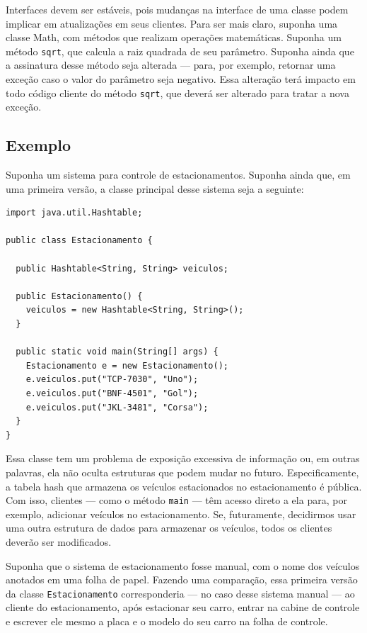 \documentclass[
  11pt,
  twoside]{book}
\newcommand{\passthrough}[1]{#1}
\begin{document}
Interfaces devem ser estáveis, pois mudanças na interface de uma classe
podem implicar em atualizações em seus clientes. Para ser mais claro,
suponha uma classe Math, com métodos que realizam operações matemáticas.
Suponha um método \passthrough{\lstinline!sqrt!}, que calcula a raiz
quadrada de seu parâmetro. Suponha ainda que a assinatura desse método
seja alterada --- para, por exemplo, retornar uma exceção caso o valor
do parâmetro seja negativo. Essa alteração terá impacto em todo código
cliente do método \passthrough{\lstinline!sqrt!}, que deverá ser
alterado para tratar a nova exceção.

\hypertarget{exemplo-1}{%
\subsection{Exemplo}\label{exemplo-1}}

Suponha um sistema para controle de estacionamentos. Suponha ainda que,
em uma primeira versão, a classe principal desse sistema seja a
seguinte:

\begin{lstlisting}
import java.util.Hashtable;

public class Estacionamento {

  public Hashtable<String, String> veiculos;

  public Estacionamento() {
    veiculos = new Hashtable<String, String>();
  }

  public static void main(String[] args) {
    Estacionamento e = new Estacionamento();
    e.veiculos.put("TCP-7030", "Uno");
    e.veiculos.put("BNF-4501", "Gol");
    e.veiculos.put("JKL-3481", "Corsa");
  }
}
\end{lstlisting}

Essa classe tem um problema de exposição excessiva de informação ou, em
outras palavras, ela não oculta estruturas que podem mudar no futuro.
Especificamente, a tabela hash que armazena os veículos estacionados no
estacionamento é pública. Com isso, clientes --- como o método
\passthrough{\lstinline!main!} --- têm acesso direto a ela para, por
exemplo, adicionar veículos no estacionamento. Se, futuramente,
decidirmos usar uma outra estrutura de dados para armazenar os veículos,
todos os clientes deverão ser modificados.

Suponha que o sistema de estacionamento fosse manual, com o nome dos
veículos anotados em uma folha de papel. Fazendo uma comparação, essa
primeira versão da classe \passthrough{\lstinline!Estacionamento!}
corresponderia --- no caso desse sistema manual --- ao cliente do
estacionamento, após estacionar seu carro, entrar na cabine de controle
e escrever ele mesmo a placa e o modelo do seu carro na folha de
controle.
\end{document}
